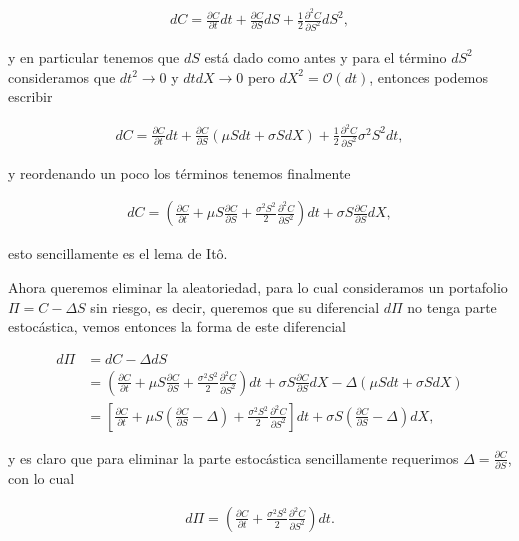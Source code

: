 \documentclass[letter]{article}
\begin{document}
\begin{enumerate}
\begin{enumerate}[label=\alph*)]
\begin{align*}
    dC = \frac{\partial C}{\partial t}dt + \frac{\partial C}{\partial S} dS + \frac{1}{2}\frac{\partial^2C}{\partial S^2}dS^2,
\end{align*}

y en particular tenemos que $dS$ está dado como antes y para el término $dS^2$ consideramos que $dt^2 \to 0$ y $dtdX \to 0$ pero $dX^2 = \mathcal{O}(dt)$, entonces podemos escribir

\begin{align*}
    dC = \frac{\partial C}{\partial t}dt + \frac{\partial C}{\partial S}(\mu Sdt + \sigma S dX) + \frac{1}{2}\frac{\partial^2C}{\partial S^2}\sigma^2S^2dt,
\end{align*}

y reordenando un poco los términos tenemos finalmente

\begin{align*}
    dC = \left(\frac{\partial C}{\partial t} + \mu S\frac{\partial C}{\partial S} + \frac{\sigma^2S^2}{2}\frac{\partial^2C}{\partial S^2}\right)dt + \sigma S\frac{\partial C}{\partial S}dX,
\end{align*}

esto sencillamente es el lema de Itô.

Ahora queremos eliminar la aleatoriedad, para lo cual consideramos un portafolio $\Pi = C - \Delta S$ sin riesgo, es decir, queremos que su diferencial $d\Pi$ no tenga parte estocástica, vemos entonces la forma de este diferencial

\begin{align*}
    d\Pi &= dC - \Delta dS\\
    &= \left(\frac{\partial C}{\partial t} + \mu S\frac{\partial C}{\partial S} + \frac{\sigma^2S^2}{2}\frac{\partial^2C}{\partial S^2}\right)dt + \sigma S\frac{\partial C}{\partial S}dX - \Delta\left(\mu Sdt + \sigma SdX\right)\\
    &= \left[\frac{\partial C}{\partial t} + \mu S\left(\frac{\partial C}{\partial S} - \Delta\right) + \frac{\sigma^2S^2}{2}\frac{\partial^2C}{\partial S^2}\right]dt + \sigma S\left(\frac{\partial C}{\partial S} - \Delta\right)dX,
\end{align*}

y es claro que para eliminar la parte estocástica sencillamente requerimos $\Delta = \frac{\partial C}{\partial S}$, con lo cual

\begin{align*}
    d\Pi = \left(\frac{\partial C}{\partial t} + \frac{\sigma^2S^2}{2}\frac{\partial^2C}{\partial S^2}\right)dt.
\end{align*}


\end{enumerate}
\end{enumerate}
\end{document}

